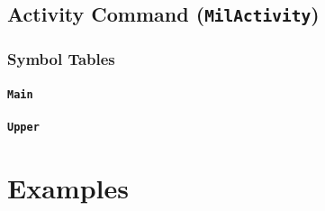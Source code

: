\documentclass[a4paper, titlepage]{article}
\begin{document}
\subsection{Activity Command (\textbf{\texttt{MilActivity}})}

\subsubsection{Symbol Tables}

\paragraph{\texttt{Main}}

\paragraph{\texttt{Upper}}

\section{Examples}

%
%
%
%
%
%
%
%
%
%
%
%
%
%
%
%
%
%
%
%
%
%
%
%
%
%
%
%
%
%
%
\end{document}
